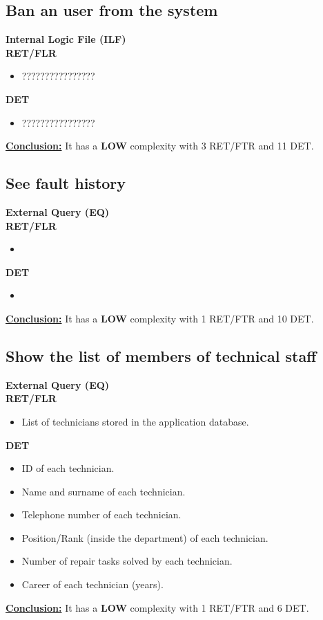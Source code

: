 \subsection{Ban an user from the system}
\textbf{Internal Logic File (ILF)} \\ 
\textbf{RET/FLR}
\begin{itemize}
\item ????????????????
\end{itemize}
\textbf{DET}
\begin{itemize}
\item ????????????????
\end{itemize}
\textbf{\underline{Conclusion:}} It has a \textbf{LOW} complexity with 3 RET/FTR and 11 DET.

\subsection{See fault history}
\textbf{External Query (EQ)} \\ 
\textbf{RET/FLR}
\begin{itemize}
\item
\end{itemize}
\textbf{DET}
\begin{itemize}
\item
\end{itemize}
\textbf{\underline{Conclusion:}} It has a \textbf{LOW} complexity with 1 RET/FTR and 10 DET.

\subsection{Show the list of members of technical staff}
\textbf{External Query (EQ)} \\ 
\textbf{RET/FLR}
\begin{itemize}
\item List of technicians stored in the application database.
\end{itemize}
\textbf{DET}
\begin{itemize}
\item ID of each technician.
\item Name and surname of each technician.
\item Telephone number of each technician.
\item Position/Rank (inside the department) of each technician.
\item Number of repair tasks solved by each technician.
\item Career of each technician (years). 
\end{itemize}
\textbf{\underline{Conclusion:}} It has a \textbf{LOW} complexity with 1 RET/FTR and 6 DET.

